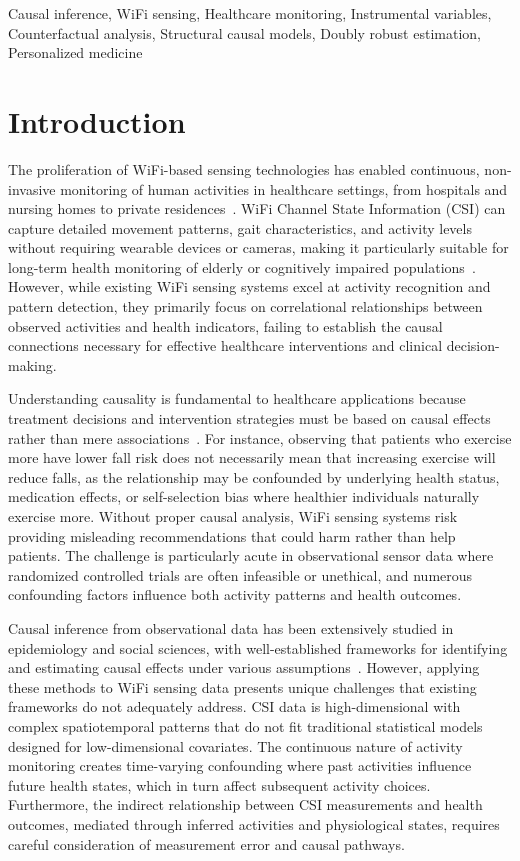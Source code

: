 \documentclass[journal]{IEEEtran}
\begin{document}
\begin{IEEEkeywords}
Causal inference, WiFi sensing, Healthcare monitoring, Instrumental variables, Counterfactual analysis, Structural causal models, Doubly robust estimation, Personalized medicine
\end{IEEEkeywords}

\section{Introduction}

The proliferation of WiFi-based sensing technologies has enabled continuous, non-invasive monitoring of human activities in healthcare settings, from hospitals and nursing homes to private residences~\cite{healthcare2024wifi, iotj2023health}. WiFi Channel State Information (CSI) can capture detailed movement patterns, gait characteristics, and activity levels without requiring wearable devices or cameras, making it particularly suitable for long-term health monitoring of elderly or cognitively impaired populations~\cite{elderly2023monitoring}. However, while existing WiFi sensing systems excel at activity recognition and pattern detection, they primarily focus on correlational relationships between observed activities and health indicators, failing to establish the causal connections necessary for effective healthcare interventions and clinical decision-making.

Understanding causality is fundamental to healthcare applications because treatment decisions and intervention strategies must be based on causal effects rather than mere associations~\cite{causal2023medicine}. For instance, observing that patients who exercise more have lower fall risk does not necessarily mean that increasing exercise will reduce falls, as the relationship may be confounded by underlying health status, medication effects, or self-selection bias where healthier individuals naturally exercise more. Without proper causal analysis, WiFi sensing systems risk providing misleading recommendations that could harm rather than help patients. The challenge is particularly acute in observational sensor data where randomized controlled trials are often infeasible or unethical, and numerous confounding factors influence both activity patterns and health outcomes.

Causal inference from observational data has been extensively studied in epidemiology and social sciences, with well-established frameworks for identifying and estimating causal effects under various assumptions~\cite{pearl2009causality, hernan2020causal}. However, applying these methods to WiFi sensing data presents unique challenges that existing frameworks do not adequately address. CSI data is high-dimensional with complex spatiotemporal patterns that do not fit traditional statistical models designed for low-dimensional covariates. The continuous nature of activity monitoring creates time-varying confounding where past activities influence future health states, which in turn affect subsequent activity choices. Furthermore, the indirect relationship between CSI measurements and health outcomes, mediated through inferred activities and physiological states, requires careful consideration of measurement error and causal pathways.
\end{document}
